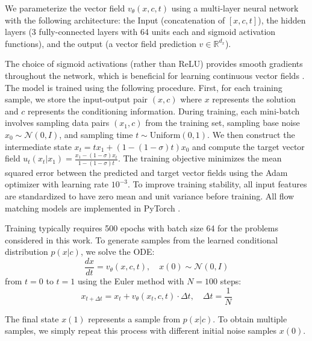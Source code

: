\documentclass{achemso}
\begin{document}
We parameterize the vector field \(v_\theta(x, c, t)\) using a multi-layer neural network with the following architecture: the Input (concatenation of \([x, c, t]\)), the hidden layers (3 fully-connected layers with 64 units each and sigmoid activation functions), and the output (a vector field prediction \(v \in \mathbb{R}^{d_x}\)).

The choice of sigmoid activations (rather than ReLU) provides smooth gradients throughout the network, which is beneficial for learning continuous vector fields \cite{chen2018neural}. The model is trained using the following procedure. First, for each training sample, we store the input-output pair \((x, c)\) where \(x\) represents the solution and \(c\) represents the conditioning information. During training, each mini-batch involves sampling data pairs \((x_1, c)\) from the training set, sampling base noise \(x_0 \sim \mathcal{N}(0, I)\), and sampling time \(t \sim \text{Uniform}(0,1)\). We then construct the intermediate state \(x_t = t x_1 + (1-(1-\sigma)t)x_0\) and compute the target vector field \(u_t(x_t | x_1) = \frac{x_1 - (1-\sigma)x_t}{1-(1-\sigma)t}\). The training objective minimizes the mean squared error between the predicted and target vector fields using the Adam optimizer \cite{kingma2014adam} with learning rate \(10^{-3}\). To improve training stability, all input features are standardized to have zero mean and unit variance before training. All flow matching models are implemented in PyTorch \cite{paszke2019pytorch}.

Training typically requires 500 epochs with batch size 64 for the problems considered in this work. To generate samples from the learned conditional distribution \(p(x|c)\), we solve the ODE:
\begin{equation}
\frac{dx}{dt} = v_\theta(x, c, t), \quad x(0) \sim \mathcal{N}(0, I)
\end{equation}
from \(t=0\) to \(t=1\) using the Euler method with \(N=100\) steps:
\begin{equation}
x_{t+\Delta t} = x_t + v_\theta(x_t, c, t) \cdot \Delta t, \quad \Delta t = \frac{1}{N}
\end{equation}

The final state \(x(1)\) represents a sample from \(p(x|c)\). To obtain multiple samples, we simply repeat this process with different initial noise samples \(x(0)\).
\end{document}
